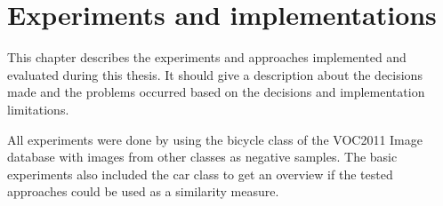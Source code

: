 \chapter{Experiments and implementations}
\label{cha:work}

This chapter describes the experiments and approaches implemented and evaluated during this thesis. It should give a description about the decisions made and the problems occurred based on the decisions and implementation limitations.

All experiments were done by using the bicycle class of the \ac{VOC2011} Image database \cite{Pascal2011} with images from other classes as negative samples. The basic experiments also included the car class to get an overview if the tested approaches could be used as a similarity measure.













